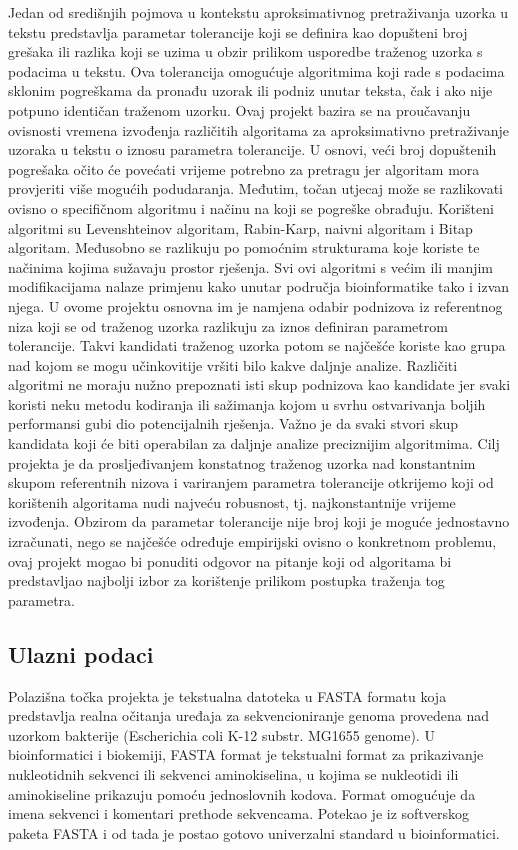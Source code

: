 \documentclass[conference]{IEEEtran}
\begin{document}
Jedan od središnjih pojmova u kontekstu aproksimativnog pretraživanja uzorka u tekstu predstavlja  parametar tolerancije koji se definira kao dopušteni broj grešaka ili razlika koji se uzima u obzir prilikom usporedbe traženog uzorka s podacima u tekstu. Ova tolerancija omogućuje algoritmima koji rade s podacima sklonim pogreškama da pronađu uzorak ili podniz unutar teksta, čak i ako nije potpuno identičan traženom uzorku. Ovaj projekt bazira se na proučavanju ovisnosti vremena izvođenja različitih algoritama za aproksimativno pretraživanje uzoraka u tekstu o iznosu parametra tolerancije. U osnovi, veći broj dopuštenih pogrešaka očito će povećati vrijeme potrebno za pretragu jer algoritam mora provjeriti više mogućih podudaranja. Međutim, točan utjecaj može se razlikovati ovisno o specifičnom algoritmu i načinu na koji se pogreške obrađuju. Korišteni algoritmi su Levenshteinov algoritam, Rabin-Karp, naivni algoritam i Bitap algoritam. Međusobno se razlikuju po pomoćnim strukturama koje koriste te načinima kojima sužavaju prostor rješenja. Svi ovi algoritmi s većim ili manjim modifikacijama nalaze  primjenu kako unutar područja bioinformatike tako i izvan njega. U ovome projektu osnovna im je namjena odabir podnizova iz referentnog niza koji se od traženog uzorka razlikuju za iznos definiran parametrom tolerancije. Takvi kandidati traženog uzorka potom se najčešće koriste kao grupa nad kojom se mogu učinkovitije vršiti bilo kakve daljnje analize. Različiti algoritmi ne moraju nužno prepoznati isti skup podnizova kao kandidate jer svaki koristi neku metodu kodiranja ili sažimanja kojom u svrhu ostvarivanja boljih  performansi gubi dio potencijalnih rješenja. Važno je da svaki stvori skup kandidata koji će biti operabilan za daljnje analize preciznijim algoritmima. Cilj projekta je da prosljeđivanjem  konstatnog traženog uzorka nad konstantnim skupom referentnih nizova i variranjem parametra tolerancije otkrijemo koji od korištenih algoritama nudi najveću robusnost, tj. najkonstantnije vrijeme izvođenja. Obzirom da parametar tolerancije nije broj koji je moguće jednostavno izračunati, nego se najčešće određuje empirijski  ovisno o konkretnom problemu, ovaj projekt mogao bi ponuditi odgovor na pitanje koji od algoritama bi predstavljao najbolji izbor za korištenje prilikom postupka traženja tog parametra. 

\subsection{Ulazni podaci}
Polazišna točka projekta je tekstualna datoteka u FASTA formatu koja predstavlja realna očitanja uređaja za sekvencioniranje genoma provedena nad uzorkom bakterije (Escherichia coli K-12 substr. MG1655 genome). U bioinformatici i biokemiji, FASTA format je tekstualni format za prikazivanje nukleotidnih sekvenci ili sekvenci aminokiselina, u kojima se nukleotidi ili aminokiseline prikazuju pomoću jednoslovnih kodova. Format omogućuje da imena sekvenci i komentari prethode sekvencama. Potekao je iz softverskog paketa FASTA i od tada je postao gotovo univerzalni standard u bioinformatici. 
\end{document}
